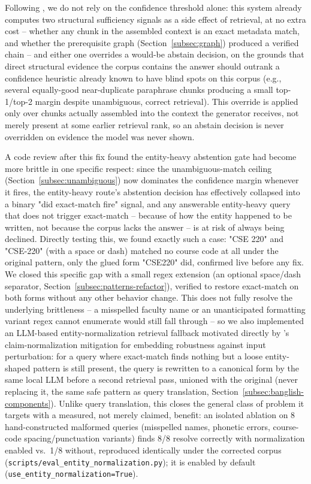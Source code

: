 \documentclass[a4paper,twoside]{article}
\begin{document}
Following \citet{joren2024}, we do not rely on the confidence threshold alone: this system already computes two structural sufficiency signals as a side effect of retrieval, at no extra cost -- whether any chunk in the assembled context is an exact metadata match, and whether the prerequisite graph (Section~\ref{subsec:graph}) produced a verified chain -- and either one overrides a would-be abstain decision, on the grounds that direct structural evidence the corpus contains the answer should outrank a confidence heuristic already known to have blind spots on this corpus (e.g., several equally-good near-duplicate paraphrase chunks producing a small top-1/top-2 margin despite unambiguous, correct retrieval). This override is applied only over chunks actually assembled into the context the generator receives, not merely present at some earlier retrieval rank, so an abstain decision is never overridden on evidence the model was never shown.

A code review after this fix found the entity-heavy abstention gate had become more brittle in one specific respect: since the unambiguous-match ceiling (Section~\ref{subsec:unambiguous}) now dominates the confidence margin whenever it fires, the entity-heavy route's abstention decision has effectively collapsed into a binary "did exact-match fire" signal, and any answerable entity-heavy query that does not trigger exact-match -- because of how the entity happened to be written, not because the corpus lacks the answer -- is at risk of always being declined. Directly testing this, we found exactly such a case: "CSE 220" and "CSE-220" (with a space or dash) matched no course code at all under the original pattern, only the glued form "CSE220" did, confirmed live before any fix. We closed this specific gap with a small regex extension (an optional space/dash separator, Section~\ref{subsec:patterns-refactor}), verified to restore exact-match on both forms without any other behavior change. This does not fully resolve the underlying brittleness -- a misspelled faculty name or an unanticipated formatting variant regex cannot enumerate would still fall through -- so we also implemented an LLM-based entity-normalization retrieval fallback motivated directly by \citet{magomere2025}'s claim-normalization mitigation for embedding robustness against input perturbation: for a query where exact-match finds nothing but a loose entity-shaped pattern is still present, the query is rewritten to a canonical form by the same local LLM before a second retrieval pass, unioned with the original (never replacing it, the same safe pattern as query translation, Section~\ref{subsec:banglish-components}). Unlike query translation, this closes the general class of problem it targets with a measured, not merely claimed, benefit: an isolated ablation on 8 hand-constructed malformed queries (misspelled names, phonetic errors, course-code spacing/punctuation variants) finds 8/8 resolve correctly with normalization enabled vs.\ 1/8 without, reproduced identically under the corrected corpus (\texttt{scripts/eval\_entity\_normalization.py}); it is enabled by default (\texttt{use\_entity\_normalization=True}).
\end{document}
